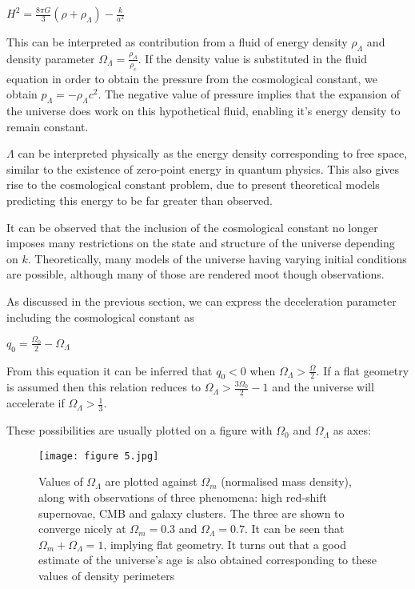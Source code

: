 \documentclass{article}
\begin{document}
\begin{center}
    $H^2 = \frac{8\pi{G}}{3}(\rho+\rho_{\Lambda}) - \frac{k}{a^2}$
\end{center}

This can be interpreted as contribution from a fluid of energy density $\rho_{\Lambda}$ and density parameter $\Omega_{\Lambda} = \frac{\rho_{\Lambda}}{\rho_c}$. If the density value is substituted in the fluid equation in order to obtain the pressure from the cosmological constant, we obtain $p_{\Lambda} = -\rho_{\Lambda}c^2$. The negative value of pressure implies that the expansion of the universe does work on this hypothetical fluid, enabling it's energy density to remain constant. 

$\Lambda$ can be interpreted physically as the energy density corresponding to free space, similar to the existence of zero-point energy in quantum physics. This also gives rise to the cosmological constant problem, due to present theoretical models predicting this energy to be far greater than observed.

It can be observed that the inclusion of the cosmological constant no longer imposes many restrictions on the state and structure of the universe depending on $k$. Theoretically, many models of the universe having varying initial conditions are possible, although many of those are rendered moot though observations.

As discussed in the previous section, we can express the deceleration parameter including the cosmological constant as 

\begin{center}
    $q_0 = \frac{\Omega_0}{2} - \Omega_{\Lambda}$
\end{center}

From this equation it can be inferred that $q_0<0$ when $\Omega_{\Lambda} > \frac{\Omega}{2}$. If a flat geometry is assumed then this relation reduces to $\Omega_{\Lambda} >\frac{3\Omega_0}{2}-1 $ and the universe will accelerate if $\Omega_{\Lambda} > \frac{1}{3}$.


These possibilities are usually plotted on a figure with $\Omega_0$ and $\Omega_{\Lambda}$ as axes:

\begin{figure}[H]
    \centering
    \texttt{[image: figure 5.jpg]}
    \caption{Values of $\Omega_{\Lambda}$ are plotted against $\Omega_m$ (normalised mass density), along with observations of three phenomena: high red-shift supernovae, CMB and galaxy clusters. The three are shown to converge nicely at $\Omega_m = 0.3$ and $\Omega_{\Lambda} = 0.7$. It can be seen that $\Omega_m+\Omega_{\Lambda} =1$, implying flat geometry. It turns out that a good estimate of the universe's age is also obtained corresponding to these values of density perimeters}
    \label{fig:density}
\end{figure}
\end{document}
